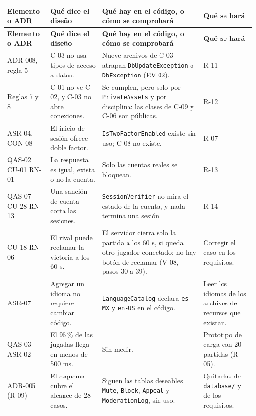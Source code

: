\documentclass[11pt,letterpaper]{article}
\newcommand{\hd}[1]{\textbf{\small #1}}
\newcommand{\headrow}{\rowcolor{SADHead}}
\begin{document}
\medskip
\begin{xltabular}{\linewidth}{|>{\raggedright\arraybackslash}p{2.8cm}|Y|Y|Y|}\hline
  \headrow\hd{Elemento o ADR} & \hd{Qué dice el diseño} & \hd{Qué hay en el código, o cómo se comprobará} & \hd{Qué se hará}\\\hline
  \endfirsthead
  \headrow\hd{Elemento o ADR} & \hd{Qué dice el diseño} & \hd{Qué hay en el código, o cómo se comprobará} & \hd{Qué se hará}\\\hline
  \endhead
  \small ADR-008, regla 5 & C-03 no usa tipos de acceso a datos. & Nueve archivos de C-03 atrapan \texttt{DbUpdate\allowbreak Exception} o \texttt{DbException} (EV-02). & R-11\\\hline
  \small Reglas 7 y 8 & C-01 no ve C-02, y C-03 no abre conexiones. & Se cumplen, pero solo por \texttt{PrivateAssets} y por disciplina: las clases de C-09 y C-06 son públicas. & R-12\\\hline
  \small ASR-04, CON-08 & El inicio de sesión ofrece doble factor. & \texttt{IsTwoFactor\allowbreak Enabled} existe sin uso; C-08 no existe. & R-07\\\hline
  \small QAS-02, CU-01 RN-01 & La respuesta es igual, exista o no la cuenta. & Solo las cuentas reales se bloquean. & R-13\\\hline
  \small QAS-07, CU-28 RN-13 & Una sanción de cuenta corta las sesiones. & \texttt{SessionVerifier} no mira el estado de la cuenta, y nada termina una sesión. & R-14\\\hline
  \small CU-18 RN-06 & El rival puede reclamar la victoria a los 60 s. & El servidor cierra solo la partida a los 60 s, si queda otro jugador conectado; no hay botón de reclamar (V-08, pasos 30 a 39). & Corregir el caso en los requisitos.\\\hline
  \small ASR-07 & Agregar un idioma no requiere cambiar código. & \texttt{LanguageCatalog} declara \texttt{es-MX} y \texttt{en-US} en el código. & Leer los idiomas de los archivos de recursos que existan.\\\hline
  \small QAS-03, ASR-02 & El 95\,\% de las jugadas llega en menos de 500 ms. & Sin medir. & Prototipo de carga con 20 partidas (R-05).\\\hline
  \small ADR-005 (R-09) & El esquema cubre el alcance de 28 casos. & Siguen las tablas deseables \texttt{Mute}, \texttt{Block}, \texttt{Appeal} y \texttt{Moderation\allowbreak Log}, sin uso. & Quitarlas de \texttt{database/} y de los requisitos.\\\hline
\end{xltabular}
\end{document}
